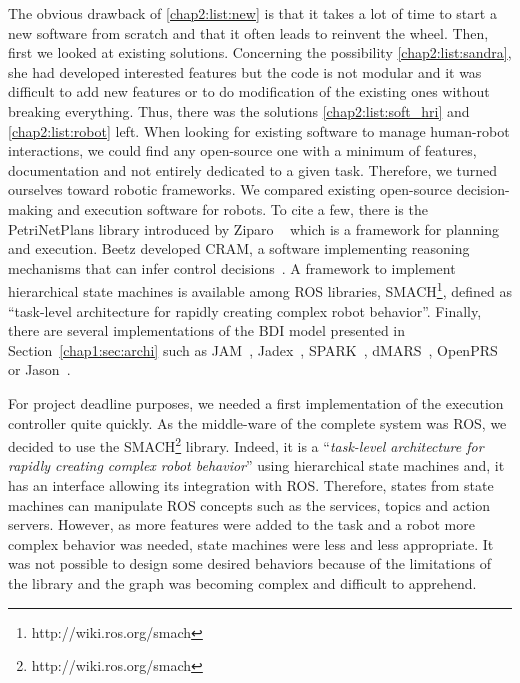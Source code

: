 \documentclass[a4paper,11pt,twoside]{StyleThese}
\begin{document}
The obvious drawback of \ref{chap2:list:new} is that it takes a lot of time to start a new software from scratch and that it often leads to reinvent the wheel. Then, first we looked at existing solutions. Concerning the possibility \ref{chap2:list:sandra}, she had developed interested features but the code is not modular and it was difficult to add new features or to do modification of the existing ones without breaking everything. Thus, there was the solutions \ref{chap2:list:soft_hri} and \ref{chap2:list:robot} left. When looking for existing software to manage human-robot interactions, we could find any open-source one with a minimum of features, documentation and not entirely dedicated to a given task. Therefore, we turned ourselves toward robotic frameworks. We compared existing open-source decision-making and execution software for robots. To cite a few, there is the PetriNetPlans library introduced by Ziparo \etal~\cite{ziparo_2011_petri} which is a framework for planning and execution. Beetz \etal{} developed CRAM, a software implementing reasoning mechanisms that can infer control decisions~\cite{beetz_2010_cram}. A framework to implement hierarchical state machines is available among ROS libraries, SMACH\footnote{http://wiki.ros.org/smach}, defined as ``task-level architecture for rapidly creating complex robot behavior''. Finally, there are several implementations of the BDI model presented in Section~\ref{chap1:sec:archi} such as JAM~\cite{huber_1999_jam}, Jadex~\cite{braudach_2005_jadex}, SPARK~\cite{morley_2004_spark}, dMARS~\cite{dinverno_1998_formal}, OpenPRS~\cite{ingrand_1996_prs} or Jason~\cite{bordini_2007_jason}.

For project deadline purposes, we needed a first implementation of the execution controller quite quickly. As the middle-ware of the complete system was ROS, we decided to use the SMACH\footnote{http://wiki.ros.org/smach} library. Indeed, it is a ``\textit{task-level architecture for rapidly creating complex robot behavior}'' using hierarchical state machines and, it has an interface allowing its integration with ROS. Therefore, states from state machines can manipulate ROS concepts such as the services, topics and action servers. However, as more features were added to the task and a robot more complex behavior was needed, state machines were less and less appropriate. It was not possible to design some desired behaviors because of the limitations of the library and the graph was becoming complex and difficult to apprehend.
\end{document}
